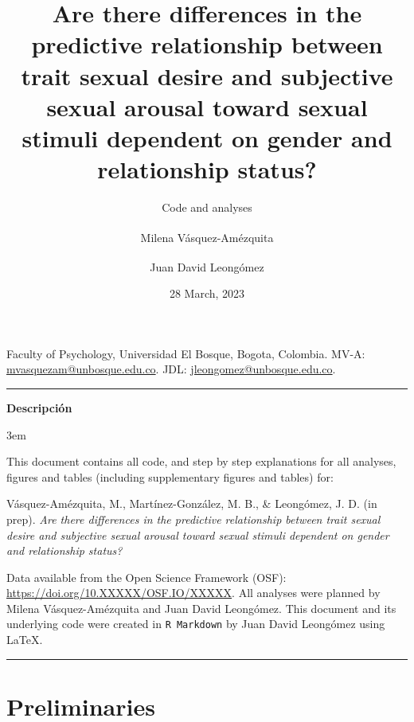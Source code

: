\documentclass[
  bookmarksnumbered]{article}
\title{Are there differences in the predictive relationship between trait sexual desire and subjective sexual arousal toward sexual stimuli dependent on gender and relationship status?}
\subtitle{Code and analyses}
\author{Milena Vásquez-Amézquita \orcidlink{0000-0001-7317-8430}\textsuperscript{} \and Juan David Leongómez \orcidlink{0000-0002-0092-6298}\textsuperscript{}}
\date{28 March, 2023}
\begin{document}
\maketitle

\begin{center}
Faculty of Psychology, Universidad El Bosque, Bogota, Colombia. \linebreak
MV-A: \href{mailto:mvasquezam@unbosque.edu.co}{mvasquezam@unbosque.edu.co}. 
JDL: \href{mailto:jleongomez@unbosque.edu.co}{jleongomez@unbosque.edu.co}.

\begin{center}\rule{0.5\linewidth}{0.5pt}\end{center}

\textbf{Descripción}
\end{center}

\par
\begingroup
\leftskip3em
\rightskip\leftskip

This document contains all code, and step by step explanations for all analyses, figures and tables (including supplementary figures and tables) for:

\begin{hangparas}{.25in}{1}
Vásquez-Amézquita, M., Martínez-González, M. B., \& Leongómez, J. D. (in prep). \textit{Are there differences in the predictive relationship between trait sexual desire and subjective sexual arousal toward sexual stimuli dependent on gender and relationship status?}
\end{hangparas}

Data available from the Open Science Framework (OSF): \url{https://doi.org/10.XXXXX/OSF.IO/XXXXX}. All analyses were planned by Milena Vásquez-Amézquita and Juan David Leongómez. This document and its underlying code were created in \texttt{R\ Markdown} by Juan David Leongómez using \LaTeX.

\begin{center}\rule{0.5\linewidth}{0.5pt}\end{center}

\par
\endgroup

{\hypersetup{hidelinks}
\setcounter{tocdepth}{6}
\tableofcontents
}
\opensupplement

\newpage

\hypertarget{preliminaries}{%
\section{Preliminaries}\label{preliminaries}}
\end{document}
